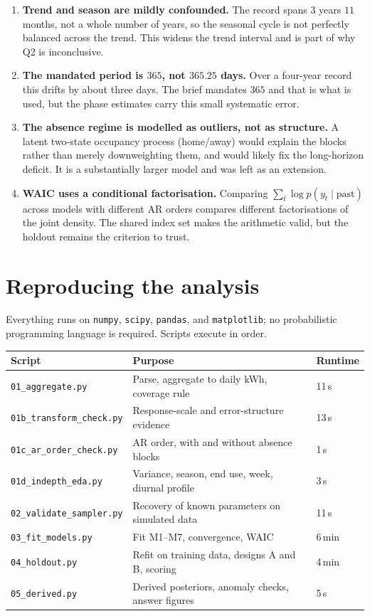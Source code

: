 \documentclass[11pt]{article}
\newcommand{\code}[1]{\texttt{\small #1}}
\begin{document}
\begin{enumerate}[leftmargin=*]
\item \textbf{Trend and season are mildly confounded.} The record spans $3$
years $11$ months, not a whole number of years, so the seasonal cycle is not
perfectly balanced across the trend. This widens the trend interval and is part
of why Q2 is inconclusive.

\item \textbf{The mandated period is $365$, not $365.25$ days.} Over a
four-year record this drifts by about three days. The brief mandates $365$ and
that is what is used, but the phase estimates carry this small systematic
error.

\item \textbf{The absence regime is modelled as outliers, not as structure.}
A latent two-state occupancy process (home/away) would explain the blocks
rather than merely downweighting them, and would likely fix the long-horizon
deficit. It is a substantially larger model and was left as an extension.

\item \textbf{WAIC uses a conditional factorisation.} Comparing
$\sum_t \log p(y_t \mid \text{past})$ across models with different AR orders
compares different factorisations of the joint density. The shared index set
makes the arithmetic valid, but the holdout remains the criterion to trust.
\end{enumerate}

\section{Reproducing the analysis}

Everything runs on \code{numpy}, \code{scipy}, \code{pandas}, and
\code{matplotlib}; no probabilistic programming language is required. Scripts
execute in order.

\begin{center}
\small
\begin{tabular}{@{}lll@{}}
\toprule
Script & Purpose & Runtime \\
\midrule
\code{01\_aggregate.py} & Parse, aggregate to daily kWh, coverage rule & 11\,s \\
\code{01b\_transform\_check.py} & Response-scale and error-structure evidence & 13\,s \\
\code{01c\_ar\_order\_check.py} & AR order, with and without absence blocks & 1\,s \\
\code{01d\_indepth\_eda.py} & Variance, season, end use, week, diurnal profile & 3\,s \\
\code{02\_validate\_sampler.py} & Recovery of known parameters on simulated data & 11\,s \\
\code{03\_fit\_models.py} & Fit M1--M7, convergence, WAIC & 6\,min \\
\code{04\_holdout.py} & Refit on training data, designs A and B, scoring & 4\,min \\
\code{05\_derived.py} & Derived posteriors, anomaly checks, answer figures & 5\,s \\
\bottomrule
\end{tabular}
\end{center}
\end{document}
